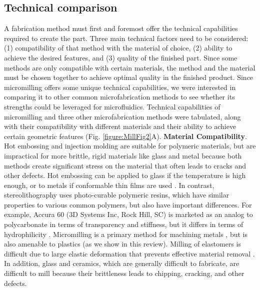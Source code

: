 \subsection{Technical comparison}
A fabrication method must first and foremost offer the technical capabilities required to create the part. Three main technical factors need to be considered: (1) compatibility of that method with the material of choice, (2) ability to achieve the desired features, and (3) quality of the finished part. Since some methods are only compatible with certain materials, the method and the material must be chosen together to achieve optimal quality in the finished product. Since micromilling offers some unique technical capabilities, we were interested in comparing it to other common microfabrication methods to see whether its strengths could be leveraged for microfluidics. Technical capabilities of micromilling and three other microfabrication methods were tabulated, along with their compatibility with different materials and their ability to achieve certain geometric features (Fig. \ref{figure:MillFig2}A). 
\textbf{Material Compatibility}. Hot embossing and injection molding are suitable for polymeric materials, but are impractical for more brittle, rigid materials like glass and metal because both methods create significant stress on the material that often leads to cracks and other defects. Hot embossing can be applied to glass if the temperature is high enough, or to metals if conformable thin films are used \cite{Kumar2009, Rabe2007}. In contrast, stereolithography uses photo-curable polymeric resins, which have similar properties to various common polymers, but also have important differences. For example, Accura 60 (3D Systems Inc, Rock Hill, SC) is marketed as an analog to polycarbonate in terms of transparency and stiffness, but it differs in terms of hydrophilicity \cite{Waldbaur2011}. Micromilling is a primary method for machining metals \cite{Childs2000}, but is also amenable to plastics (as we show in this review). Milling of elastomers is difficult due to large elastic deformation that prevents effective material removal \cite{Shih2004}. In addition, glass and ceramics, which are generally difficult to fabricate, are difficult to mill because their brittleness leads to chipping, cracking, and other defects. 
